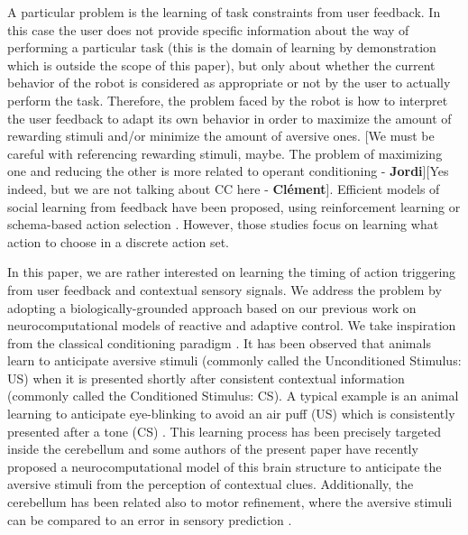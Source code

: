 \documentclass[letterpaper, 10 pt, conference]{ieeeconf}  %
\newcommand\jp[1]{{\color{red}}{\color{red}}{\footnotesize \color{red}[#1 - \textbf{Jordi}]}} %
\newcommand\cmf[1]{{\footnotesize \color{red}[#1 - \textbf{Cl\'ement}]}} %
\begin{document}
A particular problem is the learning of task constraints from user feedback. In this case the user does not provide specific information about the way of performing a particular task (this is the domain of learning by demonstration which is outside the scope of this paper), but only about whether the current behavior of the robot is considered as appropriate or not by the user to actually perform the task. Therefore, the problem faced by the robot is how to interpret the user feedback to adapt its own behavior in order to maximize the amount of rewarding stimuli and/or minimize the amount of aversive ones. \jp{We must be careful with referencing rewarding stimuli, maybe. The problem of maximizing one and reducing the other is more related to operant conditioning}\cmf{Yes indeed, but we are not talking about CC here}. Efficient models of social learning from feedback have been proposed, using reinforcement learning \cite{blumberg2002integrated,isbell2001social} or schema-based action selection \cite{kaplan2002robotic}. However, those studies focus on learning what action to choose in a discrete action set.

In this paper, we are rather interested on learning the timing of action triggering from user feedback and contextual sensory signals. We address the problem by adopting a biologically-grounded approach based on our previous work on neurocomputational models of reactive and adaptive control. We take inspiration from the classical conditioning paradigm \cite{pavlov1927conditioned}. It has been observed that animals learn to anticipate aversive stimuli (commonly called the Unconditioned Stimulus: US) when it is presented shortly after consistent contextual information (commonly called the Conditioned Stimulus: CS). A typical example is an animal learning to anticipate eye-blinking to avoid an air puff (US) which is consistently presented after a tone (CS) \cite{gormezano1987classical}. This learning process has been precisely targeted inside the cerebellum \cite{christian2003neural, yeo1998cerebellum} and some authors of the present paper have recently proposed a neurocomputational model of this brain structure \cite{herreros2013nucleo} to anticipate the aversive stimuli from the perception of contextual clues. Additionally, the cerebellum has been related also to motor refinement, where the aversive stimuli can be compared to an error in sensory prediction \cite{houk2003}.
\end{document}
